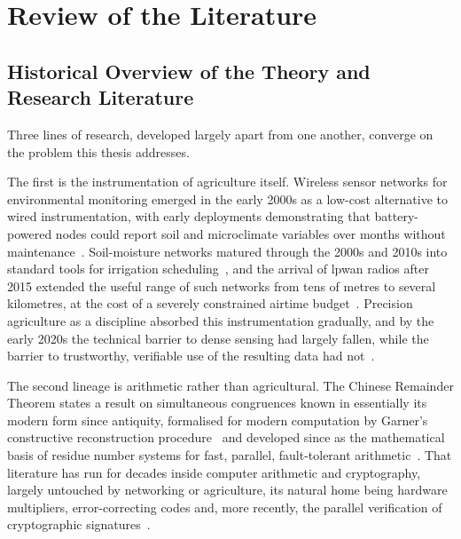 \documentclass[12pt,a4paper,oneside]{book}
\begin{document}
\chapter{Review of the Literature}
\label{ch:literature}

\section{Historical Overview of the Theory and Research Literature}
\label{sec:lit_history}

Three lines of research, developed largely apart from one another, converge on
the problem this thesis addresses.

The first is the instrumentation of agriculture itself. Wireless sensor
networks for environmental monitoring emerged in the early 2000s as a
low-cost alternative to wired instrumentation, with early deployments
demonstrating that battery-powered nodes could report soil and microclimate
variables over months without maintenance~\cite{wang2006wireless,
pierce1999site}. Soil-moisture networks matured through the 2000s and 2010s
into standard tools for irrigation scheduling~\cite{bogena2010soil,
evans2008precision}, and the arrival of \gls{lpwan} radios after 2015
extended the useful range of such networks from tens of metres to several
kilometres, at the cost of a severely constrained airtime
budget~\cite{adelantado2017understanding, raj2017comprehensive}. Precision
agriculture as a discipline absorbed this instrumentation gradually, and by
the early 2020s the technical barrier to dense sensing had largely fallen,
while the barrier to trustworthy, verifiable use of the resulting data had
not~\cite{mcbratney2005future, aydin2021comprehensive}.

The second lineage is arithmetic rather than agricultural. The Chinese
Remainder Theorem states a result on simultaneous congruences known in
essentially its modern form since antiquity, formalised for modern
computation by Garner's constructive reconstruction
procedure~\cite{garner1959residue} and developed since as the mathematical
basis of residue number systems for fast, parallel, fault-tolerant
arithmetic~\cite{ding1996remainder, parhami2010computer}. That literature
has run for decades inside computer arithmetic and cryptography, largely
untouched by networking or agriculture, its natural home being hardware
multipliers, error-correcting codes and, more recently, the parallel
verification of cryptographic
signatures~\cite{knuth1997art,hardy2008introduction,shoup2009computational}.
\end{document}
